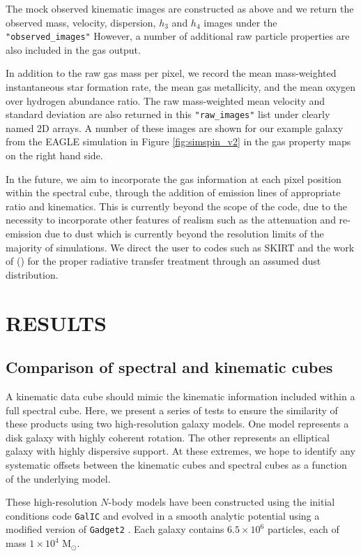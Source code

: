 \documentclass[
  journal=pasa,
  manuscript=research-paper, %
  year=2020,
  volume=37,
]{cup-journal}
\newcommand{\citetoggle}[1]{\citeauthor{#1} (\citeyear{#1})}
\begin{document}
The mock observed kinematic images are constructed as above and we return the observed mass, velocity, dispersion, $h_3$ and $h_4$ images under the \texttt{"observed\_images"}
However, a number of additional raw particle properties are also included in the gas output. 

In addition to the raw gas mass per pixel, we record the mean mass-weighted instantaneous star formation rate, the mean gas metallicity, and the mean oxygen over hydrogen abundance ratio. 
The raw mass-weighted mean velocity and standard deviation are also returned in this \texttt{"raw\_images"} list under clearly named 2D arrays. 
A number of these images are shown for our example galaxy from the EAGLE simulation in Figure \ref{fig:simspin_v2} in the gas property maps on the right hand side.

In the future, we aim to incorporate the gas information at each pixel position within the spectral cube, through the addition of emission lines of appropriate ratio and kinematics.
This is currently beyond the scope of the code, due to the necessity to incorporate other features of realism such as the attenuation and re-emission due to dust which is currently beyond the resolution limits of the majority of simulations. 
We direct the user to codes such as SKIRT \citep{Camps2020SKIRT} and the work of \citetoggle{Barrientos2023Spatiallygalaxies} for the proper radiative transfer treatment through an assumed dust distribution. 

\section{RESULTS}

\subsection{Comparison of spectral and kinematic cubes}
\label{sec:cs1}

A kinematic data cube should mimic the kinematic information included within a full spectral cube. 
Here, we present a series of tests to ensure the similarity of these products using two high-resolution galaxy models.
One model represents a disk galaxy with highly coherent rotation.
The other represents an elliptical galaxy with highly dispersive support. 
At these extremes, we hope to identify any systematic offsets between the kinematic cubes and spectral cubes as a function of the underlying model. 

These high-resolution $N$-body models have been constructed using the initial conditions code \texttt{GalIC} \citep{Yurin2014AnEquilibrium} and evolved in a smooth analytic potential using a modified version of \texttt{Gadget2} \citep{Springel2005TheGADGET-2}. 
Each galaxy contains $6.5 \times 10^{6}$ particles, each of mass $1 \times 10^{4}$ M$_{\odot}$. 
\end{document}

